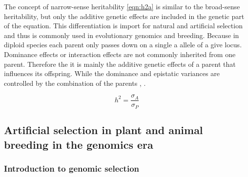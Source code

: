 The concept of narrow-sense heritability \ref{eqn:h2a} is similar to the broad-sense heritability, but only
the additive genetic effects are included in the genetic part of the equation. This differentiation is import
for natural and artificial selection and thus is commonly used in evolutionary genomics and breeding. Because
in diploid species each parent only passes down on a single a allele of a give locus. Dominance effects or
interaction effects are not commonly inherited from one parent. Therefore the it is mainly the additive
genetic effects of a parent that influences its offspring. While the dominance and epistatic variances are
controlled by the combination of the parents \cite{falconer1996}, \cite{walsh2018}.

\begin{equation}
 h^2 = \frac{\sigma_{A}}{\sigma_{P}}
 \label{eqn:h2a}
\end{equation}



\subsection{Artificial selection in plant and animal breeding in the genomics era}
\subsubsection{Introduction to genomic selection }


